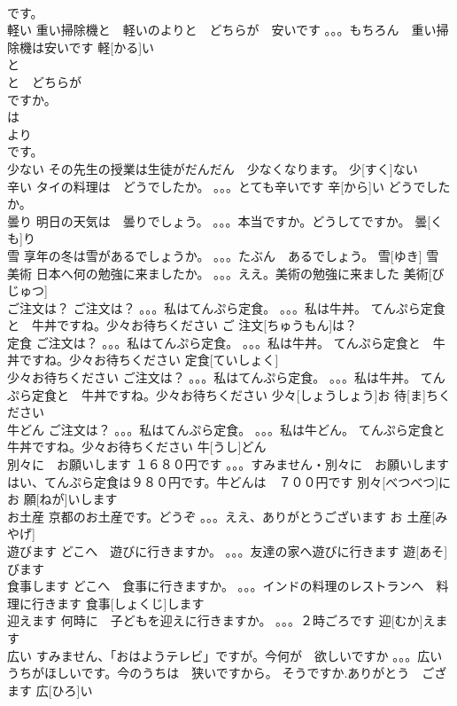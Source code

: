\documentclass[8pt]{extreport}
\begin{document}
\begin{CJK}{UTF8}{min}
\\	です。
\\	軽い	重い掃除機と　軽いのよりと　どちらが　安いです 。。。もちろん　重い掃除機は安いです	軽[かる]い				
\\	と
\\	と　どちらが　
\\	ですか。
\\	は 
\\	より　
\\	です。
\\	少ない	その先生の授業は生徒がだんだん　少なくなります。	少[すく]ない			
\\	辛い	タイの料理は　どうでしたか。 。。。とても辛いです	辛[から]い				どうでしたか。
\\	曇り	明日の天気は　曇りでしょう。 。。。本当ですか。どうしてですか。	曇[くも]り			
\\	雪	享年の冬は雪があるでしょうか。 。。。たぶん　あるでしょう。	雪[ゆき]		雪	
\\	美術	日本へ何の勉強に来ましたか。 。。。ええ。美術の勉強に来ました	美術[びじゅつ]					
\\	ご注文は？	ご注文は？ 。。。私はてんぷら定食。 。。。私は牛丼。 てんぷら定食と　牛丼ですね。少々お待ちください	ご 注文[ちゅうもん]は？			
\\	定食	ご注文は？ 。。。私はてんぷら定食。 。。。私は牛丼。 てんぷら定食と　牛丼ですね。少々お待ちください	定食[ていしょく]					
\\	少々お待ちください	ご注文は？ 。。。私はてんぷら定食。 。。。私は牛丼。 てんぷら定食と　牛丼ですね。少々お待ちください	少々[しょうしょう]お 待[ま]ちください			
\\	牛どん	ご注文は？ 。。。私はてんぷら定食。 。。。私は牛どん。 てんぷら定食と　牛丼ですね。少々お待ちください	牛[うし]どん			
\\	別々に　お願いします	１６８０円です 。。。すみません・別々に　お願いします はい、てんぷら定食は９８０円です。牛どんは　７００円です	別々[べつべつ]に　お 願[ねが]いします			
\\	お土産	京都のお土産です。どうぞ 。。。ええ、ありがとうございます	お 土産[みやげ]			
\\	遊びます	どこへ　遊びに行きますか。 。。。友達の家へ遊びに行きます	遊[あそ]びます			
\\	食事します	どこへ　食事に行きますか。 。。。インドの料理のレストランへ　料理に行きます	食事[しょくじ]します			
\\	迎えます	何時に　子どもを迎えに行きますか。 。。。２時ごろです	迎[むか]えます			
\\	広い	すみません、「おはようテレビ」ですが。今何が　欲しいですか 。。。広いうちがほしいです。今のうちは　狭いですから。 そうですか.ありがとう　ござます	広[ひろ]い			

\end{CJK}
\end{document}
